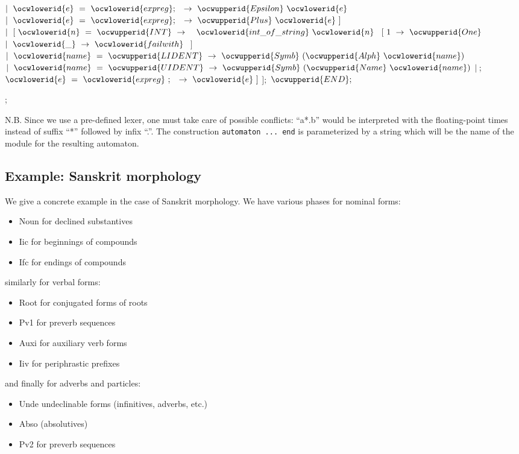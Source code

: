 \documentclass[12pt]{article}
\begin{document}
\ocwindent{3.00em}
$\mid{}~\ocwlowerid{e}~=~\ocwlowerid{expreg};~$~$\rightarrow{}~\ocwupperid{Epsilon}~\ocwlowerid{e}$\ocweol
\ocwindent{3.00em}
$\mid{}~\ocwlowerid{e}~=~\ocwlowerid{expreg};~$~$\rightarrow{}~\ocwupperid{Plus}~\ocwlowerid{e}~]$\ocweol
\ocwindent{2.00em}
$\mid{}~[~\ocwlowerid{n}~=~\ocwupperid{INT}~\rightarrow{}$\ocweol
\ocwindent{5.00em}
~$\ocwlowerid{int\_of\_string}~\ocwlowerid{n}~$\ocweol
\ocwindent{6.00em}
$[~1~\rightarrow{}~\ocwupperid{One}$\ocweol
\ocwindent{6.00em}
$\mid{}~\ocwlowerid{\_}~\rightarrow{}~\ocwlowerid{failwith}~$\ocweol
\ocwindent{6.00em}
$]$\ocweol
\ocwindent{3.00em}
$\mid{}~\ocwlowerid{name}~=~\ocwupperid{LIDENT}~\rightarrow{}~\ocwupperid{Symb}~(\ocwupperid{Alph}~\ocwlowerid{name})$\ocweol
\ocwindent{3.00em}
$\mid{}~\ocwlowerid{name}~=~\ocwupperid{UIDENT}~\rightarrow{}~\ocwupperid{Symb}~(\ocwupperid{Name}~\ocwlowerid{name})$\ocweol
\ocwindent{3.00em}
$\mid{}~$;~$\ocwlowerid{e}~=~\ocwlowerid{expreg}~;~$~$\rightarrow{}~\ocwlowerid{e}~]$\ocweol
\ocwindent{2.00em}
$];$\ocweol
\ocwindent{0.00em}
$\ocwupperid{END};$\medskip

\label{../ML/regular.ml:18206}%
\ocwindent{0.00em}
;\medskip

\ocwendcode{}\ocwindent{0.00em}
N.B. Since we use a pre-defined lexer, one must take care of possible 
   conflicts: ``a*.b'' would be interpreted with the floating-point times
   instead of suffix ``*'' followed by infix ``.''. 
\ocweol
\ocwindent{0.00em}
The construction {\tt automaton ... end} is parameterized by a string 
   which will be the name of the module for the resulting automaton. 
\ocweol
\ocwindent{0.00em}
\subsection{Example: Sanskrit morphology} 
\ocweol
\ocwindent{0.00em}
We give a concrete example in the case of Sanskrit morphology. We have various phases
for nominal forms:
\begin{itemize}
\item Noun for declined substantives
\item Iic for beginnings of compounds
\item Ifc for endings of compounds
\end{itemize}
similarly for verbal forms:
\begin{itemize}
\item Root for conjugated forms of roots
\item Pv1 for preverb sequences
\item Auxi for auxiliary verb forms
\item Iiv for periphrastic prefixes 
\end{itemize}
and finally for adverbs and particles:
\begin{itemize}
\item Unde undeclinable forms (infinitives, adverbs, etc.)
\item Abso (absolutives)
\item Pv2 for preverb sequences
\end{itemize}
\end{document}
